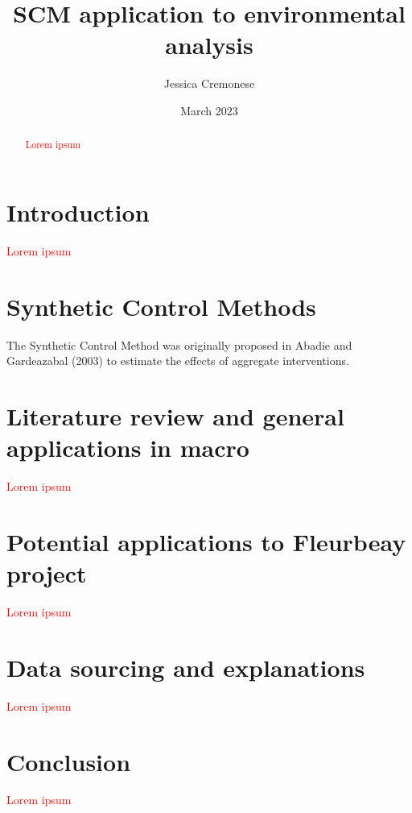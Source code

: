 \documentclass[12pt,a4paper,draft]{article}
\begin{document}
\begin{titlepage}
\title{SCM application to environmental analysis}
\author{Jessica Cremonese}
\date{March 2023}
\maketitle
\end{titlepage}

\tableofcontents

\newpage
\begin{abstract}
    \textcolor{red}{Lorem ipsum}
\end{abstract}
\newpage


\section{Introduction}
\textcolor{red}{Lorem ipsum}




\section{Synthetic Control Methods}
The Synthetic Control Method was originally proposed in Abadie and Gardeazabal (2003) to estimate the effects of aggregate interventions.




\section{Literature review and general applications in macro}
\textcolor{red}{Lorem ipsum}




\section{Potential applications to Fleurbeay project}
\textcolor{red}{Lorem ipsum}




\section{Data sourcing and explanations}
\textcolor{red}{Lorem ipsum}




\section{Conclusion}
\textcolor{red}{Lorem ipsum}
\end{document}
